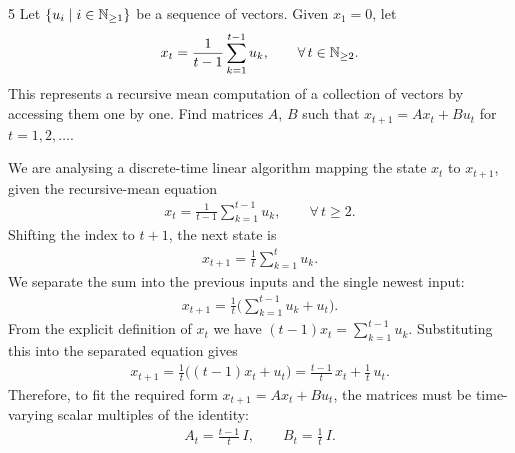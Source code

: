 \documentclass[a4paper, 11pt]{article}
\begin{document}
\begin{problem}{5}
Let $\{u_i\mid i\in\mathbb{N}_{\ge 1}\}$ be a sequence of vectors. Given $x_1=0$, let
\begin{align*}
    x_t = \frac{1}{t-1}\sum_{k=1}^{t-1}u_k, \qquad \forall\, t\in\mathbb{N}_{\ge 2}.
\end{align*}
This represents a recursive mean computation of a collection of vectors by accessing them one by one. Find matrices $A$, $B$ such that $x_{t+1}=Ax_t+Bu_t$ for $t=1,2,\dots$.
\end{problem}
\begin{solution}
We are analysing a discrete-time linear algorithm mapping the state $x_t$ to $x_{t+1}$, given the recursive-mean equation
\begin{align*}
    x_t = \frac{1}{t-1}\sum_{k=1}^{t-1}u_k, \qquad \forall\, t\ge 2.
\end{align*}
Shifting the index to $t+1$, the next state is
\begin{align*}
    x_{t+1} = \frac{1}{t}\sum_{k=1}^{t}u_k.
\end{align*}
We separate the sum into the previous inputs and the single newest input:
\begin{align*}
    x_{t+1} = \frac{1}{t}\Big(\sum_{k=1}^{t-1}u_k + u_t\Big).
\end{align*}
From the explicit definition of $x_t$ we have $(t-1)x_t=\sum_{k=1}^{t-1}u_k$. Substituting this into the separated equation gives
\begin{align*}
    x_{t+1} = \frac{1}{t}\big((t-1)x_t+u_t\big) = \frac{t-1}{t}\,x_t + \frac{1}{t}\,u_t.
\end{align*}
Therefore, to fit the required form $x_{t+1}=Ax_t+Bu_t$, the matrices must be time-varying scalar multiples of the identity:
\begin{align*}
    A_t = \frac{t-1}{t}\,I, \qquad B_t = \frac{1}{t}\,I.
\end{align*}
\end{solution}
\problemend
\end{document}
